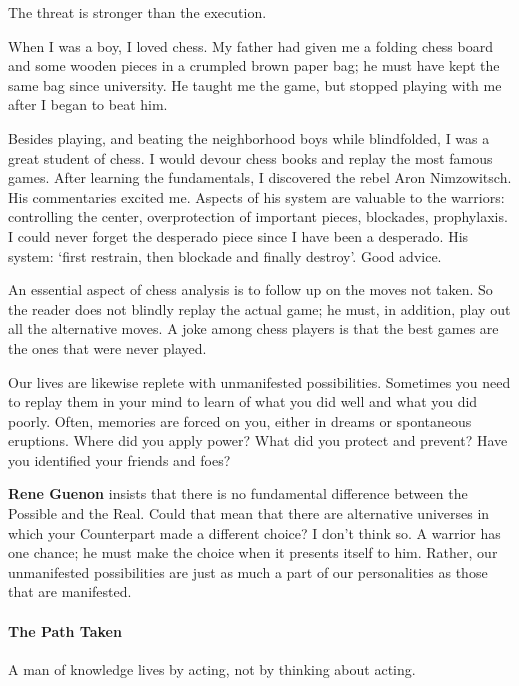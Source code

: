 \begin{quotex}
The threat is stronger than the execution.
\end{quotex}

When I was a boy, I loved chess. My father had given me a folding chess board and some wooden pieces in a crumpled brown paper bag; he must have kept the same bag since university. He taught me the game, but stopped playing with me after I began to beat him.

Besides playing, and beating the neighborhood boys while blindfolded, I was a great student of chess. I would devour chess books and replay the most famous games. After learning the fundamentals, I discovered the rebel Aron Nimzowitsch. His commentaries excited me. Aspects of his system are valuable to the warriors: controlling the center, overprotection of important pieces, blockades, prophylaxis. I could never forget the desperado piece since I have been a desperado. His system: `first restrain, then blockade and finally destroy'. Good advice.

An essential aspect of chess analysis is to follow up on the moves not taken. So the reader does not blindly replay the actual game; he must, in addition, play out all the alternative moves. A joke among chess players is that the best games are the ones that were never played.

Our lives are likewise replete with unmanifested possibilities. Sometimes you need to replay them in your mind to learn of what you did well and what you did poorly. Often, memories are forced on you, either in dreams or spontaneous eruptions. Where did you apply power? What did you protect and prevent? Have you identified your friends and foes?

\textbf{Rene Guenon} insists that there is no fundamental difference between the Possible and the Real. Could that mean that there are alternative universes in which your Counterpart made a different choice? I don't think so. A warrior has one chance; he must make the choice when it presents itself to him. Rather, our unmanifested possibilities are just as much a part of our personalities as those that are manifested.

\paragraph{The Path Taken}


\begin{quotex}
A man of knowledge lives by acting, not by thinking about acting.
\end{quotex}


